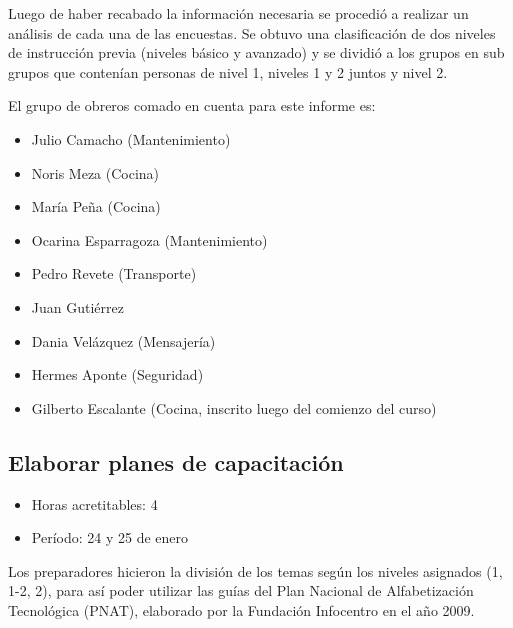                 Luego de haber recabado la información necesaria se procedió a realizar un análisis de cada una de las encuestas. Se obtuvo una clasificación de dos niveles de instrucción previa (niveles básico y avanzado) y se dividió a los grupos en sub grupos que contenían personas de nivel 1, niveles 1 y 2 juntos y nivel 2.
                
                El grupo de obreros comado en cuenta para este informe es:
                \begin{itemize}
                    \item Julio Camacho (Mantenimiento)
                    \item Noris Meza (Cocina)
                    \item María Peña (Cocina)
                    \item Ocarina Esparragoza (Mantenimiento)
                    \item Pedro Revete (Transporte)
                    \item Juan Gutiérrez
                    \item Dania Velázquez (Mensajería)
                    \item Hermes Aponte (Seguridad)
                    \item Gilberto Escalante (Cocina, inscrito luego del comienzo del curso)
                \end{itemize}
                
             \subsection {Elaborar planes de capacitación}
             \begin{itemize}
                 \item Horas acretitables: 4
                 \item Período: 24 y 25 de enero
                \end{itemize}
                
                Los preparadores hicieron la división de los temas según los niveles asignados (1, 1-2, 2), para así poder utilizar las guías del Plan Nacional de Alfabetización Tecnológica (PNAT), elaborado por la Fundación Infocentro en el año 2009.
                
